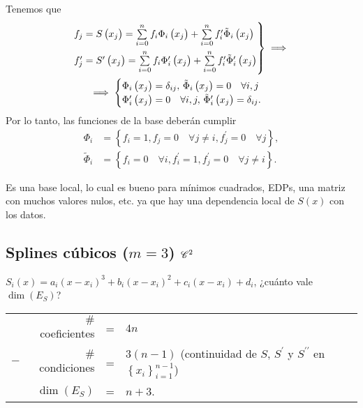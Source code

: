 Tenemos que
\begin{gather*}
    \begin{rcases}
        f_j = S\left( x_j \right) = \sum\limits_{i=0}^n f_i\Phi_i\left( x_j \right) + \sum\limits_{i=0}^n f^{\prime}_i\tilde{\Phi}_i\left( x_j \right) \\
        f^{\prime}_j = S^{\prime}\left( x_j \right) = \sum\limits_{i=0}^n f_i\Phi^{\prime}_i\left( x_j \right) + \sum\limits_{i=0}^n f^{\prime}_i\tilde{\Phi}^{\prime}_i\left( x_j \right)
    \end{rcases}
    \implies \\
    \implies
    \begin{cases}
        \Phi_i \left( x_j \right) = \delta_{ij},\, \tilde{\Phi}_i\left( x_j \right) = 0\quad \forall i,j\\
        \Phi_i ^{\prime}\left( x_j \right) = 0\quad \forall i,j,\, \tilde{\Phi}^{\prime}_i\left( x_j \right) = \delta_{ij}.
    \end{cases}
\end{gather*}
Por lo tanto, las funciones de la base deberán cumplir
\begin{align*}
    \Phi_i &= \left\{ f_i = 1, f_j=0\quad \forall j\neq i, f^{\prime}_j = 0 \quad\forall j \right\}, \\
    \tilde{\Phi}_i &= \left\{ f_i = 0\quad \forall i, f^{\prime}_i = 1, f^{\prime}_j = 0 \quad\forall j\neq i \right\}.
\end{align*}

\begin{obs}
    Es una base local, lo cual es bueno para mínimos cuadrados, EDPs, una matriz con muchos valores nulos, etc. ya que hay una dependencia local de $S\left( x \right)$ con los datos.
\end{obs}

\subsection{Splines cúbicos ($m=3$) $\mathscr{C}^2$}

$S_i\left( x \right) = a_i\left( x-x_i \right)^3 + b_i\left( x-x_i \right)^2 + c_i\left( x-x_i \right) + d_i$, ¿cuánto vale $\dim\left( E_S \right)$?

\begin{center}
    \begin{tabular}{crcl}
        & $\#$coeficientes &=& $4n$\\
        $-$ & $\#$condiciones &=& $3\left( n-1\right)$ (continuidad de $S$, $S^{\prime}$ y $S^{\prime\prime}$ en $\left\{ x_i \right\}_{i=1}^{n-1}$)\\\hline
        &$\dim\left( E_S \right)$ &=& $n+3$.
    \end{tabular}
\end{center}

